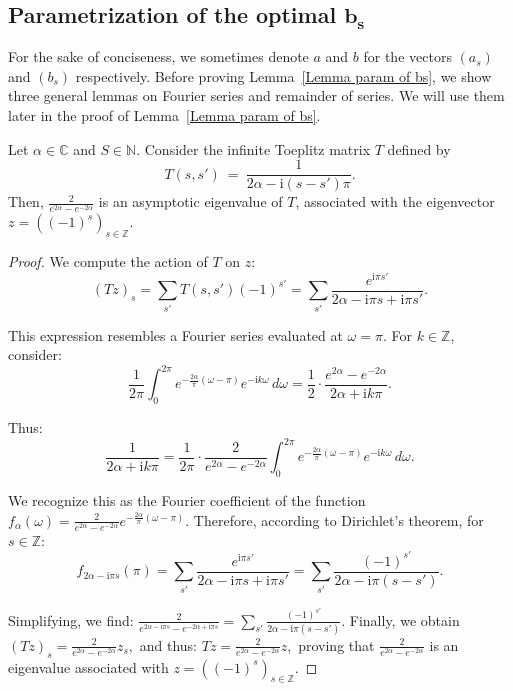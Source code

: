\subsection{Parametrization of the optimal \texorpdfstring{$\boldsymbol{b_s}$}{bs}}

\label{appendix subsection asymptotic bs}

For the sake of conciseness, we sometimes denote $a$ and $b$ for the vectors $(a_s)$ and $(b_s)$ respectively. Before proving Lemma~\ref{Lemma param of bs}, we show three general lemmas on Fourier series and remainder of series. We will use them later in the proof of Lemma~\ref{Lemma param of bs}.

\begin{lemma}\label{lemma eigenvector Toeplitz}
Let \(\alpha \in \mathbb{C}\) and \(S \in \mathbb{N}\). Consider the infinite Toeplitz matrix \(T\) defined by $$T(s, s')~=~\frac{1}{2\alpha - \mathrm{i}(s-s')\pi}.$$ Then, \(\frac{2}{e^{2\alpha} - e^{-2\alpha}}\) is an asymptotic eigenvalue of  \(T\), associated with the eigenvector \(z = ((-1)^s)_{s \in \mathbb{Z}}\).
\end{lemma}

\begin{proof}
We compute the action of \(T\) on \(z\):
\[
(Tz)_s= \sum_{s'} T(s, s')(-1)^{s'} = \sum_{s'} \frac{e^{\mathrm{i}\pi s'}}{2\alpha - \mathrm{i}\pi s + \mathrm{i}\pi s'}.
\]

This expression resembles a Fourier series evaluated at \(\omega = \pi\). For \(k \in \mathbb{Z}\), consider:
\[
\frac{1}{2\pi} \int_0^{2\pi} e^{-\frac{2\alpha}{\pi}(\omega-\pi)} e^{-\mathrm{i}k\omega} \, d\omega = \frac{1}{2} \cdot \frac{e^{2\alpha} - e^{-2\alpha}}{2\alpha + \mathrm{i}k\pi}.
\]

Thus:
\begin{equation}
\label{eq:FS}
\frac{1}{2\alpha + \mathrm{i}k\pi} = \frac{1}{2\pi} \cdot \frac{2}{e^{2\alpha} - e^{-2\alpha}} \int_0^{2\pi} e^{-\frac{2\alpha}{\pi}(\omega-\pi)} e^{-\mathrm{i}k\omega} \, d\omega.
\end{equation}

We recognize this as the Fourier coefficient of the function \(f_\alpha(\omega) = \frac{2}{e^{2\alpha} - e^{-2\alpha}} e^{-\frac{2\alpha}{\pi}(\omega-\pi)}\). Therefore, according to Dirichlet's theorem, for \(s \in \mathbb{Z}\):
\[
f_{2\alpha - \mathrm{i}\pi s}(\pi) = \sum_{s'} \frac{e^{\mathrm{i}\pi s'}}{2\alpha - \mathrm{i}\pi s + \mathrm{i}\pi s'} = \sum_{s'} \frac{(-1)^{s'}}{2\alpha - \mathrm{i}\pi(s-s')}.
\]

Simplifying, we find:
\( \displaystyle
\frac{2}{e^{2\alpha - \mathrm{i}\pi s} - e^{-2\alpha + \mathrm{i}\pi s}} = \sum_{s'} \frac{(-1)^{s'}}{2\alpha - \mathrm{i}\pi(s-s')}.
\)
Finally, we obtain
\( \displaystyle
(Tz)_s= \frac{2}{e^{2\alpha} - e^{-2\alpha}} z_s,
\)
and thus:
\( \displaystyle
Tz = \frac{2}{e^{2\alpha} - e^{-2\alpha}} z,
\)
proving that \(\frac{2}{e^{2\alpha} - e^{-2\alpha}}\) is an eigenvalue associated with \(z = ((-1)^s)_{s \in \mathbb{Z}}\).

\end{proof}

